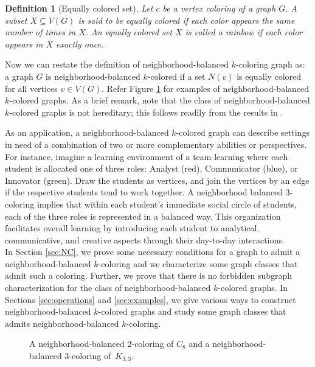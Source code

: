 \documentclass[12pt]{article}
\newtheorem{definition}[theorem]{Definition}
\newcommand{\nbc}{neighborhood-balanced $k$-coloring\xspace}
\newcommand{\nbcd}{neighborhood-balanced $k$-colored\xspace}
\begin{document}
\begin{definition}[Equally colored set] \label{def:equally-colored-set}
Let $c$ be a vertex coloring of a graph $G$.
A subset $X \subseteq V(G)$ is said to be \emph{equally colored} if each color appears the same number of times in $X$.
An equally colored set $X$ is called a rainbow if each color appears in $X$ exactly once.
\end{definition}
Now we can restate the definition of \nbc graph as: a graph $G$ is \nbcd if a set $N(v)$ is equally colored for all vertices $v \in V(G)$.
Refer Figure \ref{fig: nbc of c8} for examples of \nbcd graphs.
As a brief remark, note that the class of \nbcd graphs is not hereditary; this follows readily from the results in \cite{collin-cnbc}.

\bigskip
As an application, a \nbcd graph can describe settings in need of a combination of two or more complementary abilities or perspectives. For instance, imagine a learning environment of a team learning where each student is allocated one of three roles: Analyst (red), Communicator (blue), or Innovator (green).
Draw the students as vertices, and join the vertices by an edge if the respective students tend to work together.
A neighborhood balanced $3$-coloring implies that within each student's immediate social circle of students, each of the three roles is represented in a balanced way.
This organization facilitates overall learning by introducing each student to analytical, communicative, and creative aspects through their day-to-day interactions.\\

In Section \ref{sec:NC}, we prove some necessary conditions for a graph to admit a \nbc and we characterize some graph classes that admit such a coloring.
Further,  we prove that there is no forbidden subgraph characterization for the class of \nbcd graphs.
In Sections \ref{sec:operations} and \ref{sec:examples}, we give various ways to construct \nbcd graphs and study some graph classes that admits \nbc.

\begin{figure}
\centering

\caption{A neighborhood-balanced $2$-coloring of $C_{8}$ and a neighborhood-balanced $3$-coloring of~$K_{3,3}$.}
\label{fig: nbc of c8}
\end{figure}
\end{document}

